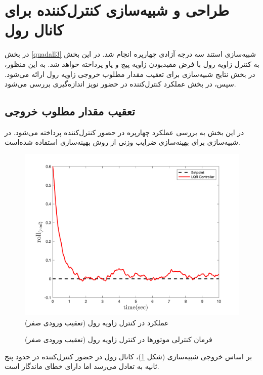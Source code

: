 \section{طراحی و شبیه‌سازی کنترل‌کننده برای کانال رول}\label{roll_lqr_section_simulation}
در بخش
\ref{quadall3}
شبیه‌سازی استند سه درجه آزادی چهارپره انجام شد.
در این بخش به کنترل زاویه رول با فرض مقید‌بودن زاویه پیچ و یاو پرداخته خواهد شد. به این منظور، در بخش نتایج شبیه‌سازی برای تعقیب مقدار مطلوب خروجی زاویه رول ارائه می‌شود. سپس، در بخش عملکرد کنترل‌کننده در  حضور نویز اندازه‌گیری بررسی می‌شود.
\subsection{تعقیب مقدار مطلوب خروجی}


 در این بخش به بررسی عملکرد چهارپره در حضور کنترل‌کننده  پرداخته می‌شود. در شبیه‌سازی برای بهینه‌سازی ضرایب وزنی  از روش بهینه‌سازی
 \cite{Karimi2010}
استفاده شده‌است.
\begin{figure}[H]
	\includegraphics[width=.48\linewidth]{../Figures/MIL/LQR/Roll/lqr_roll.png}
	\centering
	\caption{عملكرد  در کنترل زاويه رول (تعقیب ورودی صفر)}
	\label{lqr_roll_figure_simulation}
\end{figure}
\begin{figure}[H]
	\centering
	\caption{‫‪فرمان کنترلی موتورها در کنترل زاویه رول (تعقیب ورودی صفر)}
\end{figure}


بر اساس خروجی شبیه‌سازی (شکل
\ref{lqr_roll_figure_simulation})،
کانال رول در حضور کنترل‌کننده  در حدود پنج ثانیه به تعادل می‌رسد اما دارای خطای ماندگار است. 
